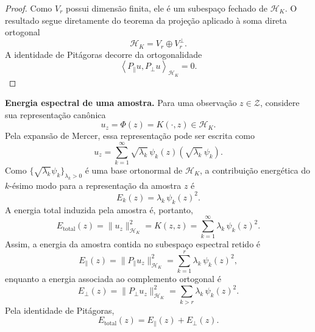 \begin{proof}
Como $V_r$ possui dimensão finita, ele é um subespaço fechado de $\mathcal{H}_K$. O resultado segue diretamente do teorema da projeção aplicado à soma direta ortogonal
\begin{equation*}
    \mathcal{H}_K
    =
    V_r
    \oplus
    V_r^\perp.
\end{equation*}
A identidade de Pitágoras decorre da ortogonalidade
\begin{equation*}
    \left\langle
        P_\parallel u,
        P_\perp u
    \right\rangle_{\mathcal{H}_K}
    =
    0.
\end{equation*}
\end{proof}
 
\textbf{Energia espectral de uma amostra.} Para uma observação $z \in \mathcal{Z}$, considere sua representação canônica
\begin{equation*}
    u_z
    =
    \Phi(z)
    =
    K(\cdot,z)
    \in
    \mathcal{H}_K.
\end{equation*}
Pela expansão de Mercer, essa representação pode ser escrita como
\begin{equation}\label{eq:sample_expansion}
    u_z
    =
    \sum_{k=1}^{\infty}
    \sqrt{\lambda_k}\,\psi_k(z)
    \left(
        \sqrt{\lambda_k}\,\psi_k
    \right).
\end{equation}
Como $\{\sqrt{\lambda_k}\psi_k\}_{\lambda_k>0}$ é uma base ortonormal de $\mathcal{H}_K$, a contribuição energética do $k$-ésimo modo para a representação da amostra $z$ é
\begin{equation}\label{eq:sample_mode_energy}
    E_k(z)
    =
    \lambda_k\,\psi_k(z)^2.
\end{equation}
A energia total induzida pela amostra é, portanto,
\begin{equation}\label{eq:sample_total_energy}
    E_{\mathrm{total}}(z)
    =
    \|u_z\|_{\mathcal{H}_K}^2
    =
    K(z,z)
    =
    \sum_{k=1}^{\infty}
    \lambda_k\,\psi_k(z)^2.
\end{equation}
Assim, a energia da amostra contida no subespaço espectral retido é
\begin{equation}\label{eq:sample_retained_energy}
    E_\parallel(z)
    =
    \|P_\parallel u_z\|_{\mathcal{H}_K}^2
    =
    \sum_{k=1}^{r}
    \lambda_k\,\psi_k(z)^2,
\end{equation}
enquanto a energia associada ao complemento ortogonal é
\begin{equation}\label{eq:sample_orthogonal_energy}
    E_\perp(z)
    =
    \|P_\perp u_z\|_{\mathcal{H}_K}^2
    =
    \sum_{k>r}
    \lambda_k\,\psi_k(z)^2.
\end{equation}
Pela identidade de Pitágoras,
\begin{equation*}
    E_{\mathrm{total}}(z)
    =
    E_\parallel(z)
    +
    E_\perp(z).
\end{equation*}
 
